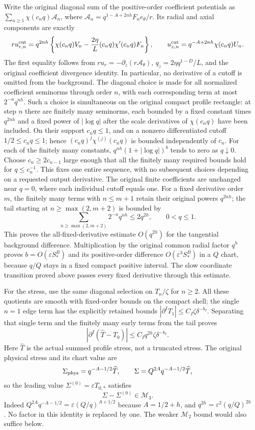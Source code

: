 \documentclass[10pt,a4paper]{article}
\begin{document}
Write the original diagonal sum of the positive-order coefficient potentials as
$\sum_{n\ge1}\chi(c_nq)\mathcal A_n$, where
$\mathcal A_n=q^{1-A+2nh}F_n e_\theta/r$.  Its radial and axial components
are exactly
\[
ru_{r,n}^{\rm cut}=q^{2nh}\left\{\chi(c_nq)V_n-
 \frac{2\eta}{L}(c_nq)\chi'(c_nq)F_n\right\},\qquad
u_{z,n}^{\rm cut}=q^{-A+2nh}\chi(c_nq)U_n.
\]
The first equality follows from $ru_r=-\partial_z(r\mathcal A_\theta)$,
$q_z=2\eta q^{1-D}/L$, and the original coefficient divergence identity.
In particular, no derivative of a cutoff is omitted from the background.
The diagonal choice is made for all normalized coefficient seminorms through
order $n$, with each corresponding term at most $2^{-n}q^{nh}$.
Such a choice is simultaneous on the original compact profile rectangle:
at step $n$ there are finitely many seminorms, each bounded by a fixed
constant times $q^{2nh}$ and a fixed power of $|\log q|$ after the
scale derivatives of $\chi(c_nq)$ have been included.  On their support
$c_nq\le1$, and on a nonzero differentiated cutoff $1/2\le c_nq\le1$;
hence $(c_nq)^j\chi^{(j)}(c_nq)$ is bounded independently of $c_n$.
For each of the finitely many constants, $q^{nh}(1+|\log q|)^b$ tends
to zero as $q\downarrow0$. Choose $c_n\ge2c_{n-1}$ large enough
that all the finitely many required bounds hold for $q\le c_n^{-1}$.
This fixes one entire sequence, with no subsequent choices depending on a
requested output derivative. The original finite coefficients are unchanged
near $q=0$, where each individual cutoff equals one.
For a fixed derivative order $m$, the finitely many terms with $n\le m+1$
retain their original powers $q^{2nh}$; the tail starting at
$n\ge\max(2,m+2)$ is bounded by
\[
\sum_{n\ge\max(2,m+2)}2^{-n}q^{nh}\le 2q^{2h},\qquad 0<q\le1.
\]
This proves the all-fixed-derivative estimate $O(q^{2h})$ for the tangential
background difference.  Multiplication by the original common radial factor
$q^h$ proves $b=O(\varepsilon S_*^B)$ and its positive-order difference
$O(\varepsilon^3 S_*^B)$ in a $Q$ chart, because $q/Q$ stays in a fixed
compact positive interval.  The slow coordinate transition proved above
passes every fixed derivative through this estimate.

For the stress, use the same diagonal selection on $T_n/\zeta$ for $n\ge2$.
All these quotients are smooth with fixed-order bounds on the compact shell;
the single $n=1$ edge term has the explicitly retained bounds
$|\partial^IT_1|\le C_I\zeta\delta^{-b_I}$.  Separating that single term
and the finitely many early terms from the tail proves
\[
|\partial^I(\widehat T-T_0)|
 \le C_Iq^{2h}\zeta\delta^{-b_I}.
\]
Here $\widehat T$ is the actual summed profile stress, not a truncated stress.
The original physical stress and its chart value are
\[
\Sigma_{\rm phys}=q^{-A-1/2}\widehat T,\qquad
\Sigma=Q^{2A}q^{-A-1/2}\widehat T,
\]
so the leading value $\Sigma^{(0)}=\varepsilon T_{0,*}$ satisfies
\[
\Sigma-\Sigma^{(0)}\in\mathcal M_3.
\tag{SI1}
\]
Indeed $Q^{2A}q^{-A-1/2}=\varepsilon(Q/q)^{A+1/2}$ because
$A=1/2+h$, and $q^{2h}=\varepsilon^2(q/Q)^{2h}$.  No factor in this
identity is replaced by one.  The weaker $\mathcal M_2$ bound would also
suffice below.
\end{document}
